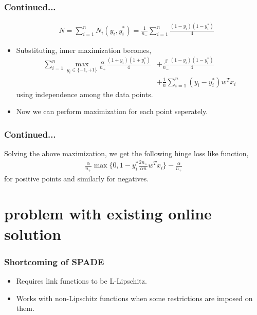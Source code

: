 \documentclass{beamer}
\begin{document}
\begin{frame}
	\frametitle{Continued...}
	\begin{align*}
	&N = \sum_{i=1}^nN_i(y_i,y_i^*)= \frac{1}{n_-}\sum_{i=1}^n\frac{(1-y_i)(1-y_i^*)}{4}
	\end{align*}
	\begin{itemize}
	\item Substituting, inner maximization becomes,
	\begin{align*}
	\sum_{i=1}^n\max_{y_i\in\{-1,+1\}}\frac{\alpha}{n_+}\frac{(1+y_i)(1+y_i^*)}{4} &+\frac{\beta}{n_-}\frac{(1-y_i)(1-y_i^*)}{4} \\
	&+ \frac{1}{n}\sum_{i=1}^n (y_i - y_i^*)w^Tx_i
	\end{align*}
	using independence among the data points.
	\item Now we can perform maximization for each point seperately.
	\end{itemize}
\end{frame}
\begin{frame}
	\frametitle{Continued...}
	Solving the above maximization, we get the following hinge loss like function,
	\begin{align*}
	\frac{\alpha}{n_+}\max\{0,1-y_i^*\frac{2n_+}{\alpha n}w^Tx_i\} - \frac{\alpha}{n_+}
	\end{align*}
	for positive points and similarly for negatives.
\end{frame}

\section{problem with existing online solution} %

\begin{frame}
	\frametitle{Shortcoming of SPADE}
	\begin{itemize}
		\item Requires link functions to be L-Lipschitz.
		\item Works with non-Lipschitz functions when some restrictions are imposed on them.
	\end{itemize}
\end{frame}
\end{document}
